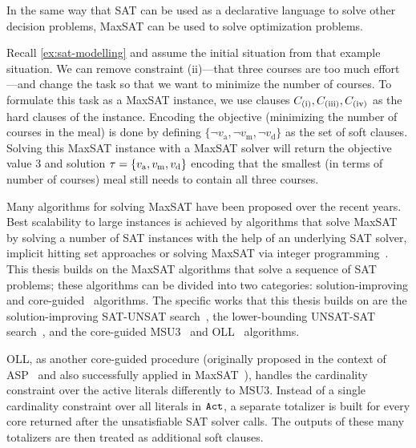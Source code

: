 In the same way that SAT can be used as a declarative language to solve other decision problems, MaxSAT can be used to solve optimization problems.

\begin{example}\label{ex:maxsat-modelling}
  Recall \cref{ex:sat-modelling} and assume the initial situation from that example situation.
  We can remove constraint (ii)---that three courses are too much effort---and change the task so that we want to minimize the number of courses.
  To formulate this task as a MaxSAT instance, we use clauses $C_\text{(i)}, C_\text{(iii)}, C_\text{(iv)}$ as the hard clauses of the instance.
  Encoding the objective (minimizing the number of courses in the meal) is done by defining $\{\lnot v_\text{a}, \lnot v_\text{m}, \lnot v_\text{d}\}$ as the set of soft clauses.
  Solving this MaxSAT instance with a MaxSAT solver will return the objective value 3 and solution $\tau=\{v_\text{a}, v_\text{m}, v_\text{d}\}$ encoding that the smallest (in terms of number of courses) meal still needs to contain all three courses.
\end{example}

Many algorithms for solving MaxSAT have been proposed over the recent years.
Best scalability to large instances is achieved by algorithms that solve MaxSAT by solving a number of SAT instances with the help of an underlying SAT solver, implicit hitting set approaches or solving MaxSAT via integer programming~\autocite{handbook2-maxsat}.
This thesis builds on the MaxSAT algorithms that solve a sequence of SAT problems;
these algorithms can be divided into two categories: solution-improving and core-guided~\autocite{DBLP:conf/sat/FuM06} algorithms.
The specific works that this thesis builds on are the solution-improving SAT-UNSAT search~\autocite{DBLP:journals/jsat/BerreP10}, the lower-bounding UNSAT-SAT search~\autocite{}, and the core-guided MSU3~\autocite{DBLP:journals/corr/abs-0712-1097} and OLL~\autocite{DBLP:conf/cp/MorgadoDM14} algorithms.

OLL, as another core-guided procedure (originally proposed in the context of ASP~\autocite{DBLP:conf/iclp/AndresKMS12} and also successfully applied in MaxSAT~\autocites{DBLP:conf/cp/MorgadoDM14,DBLP:journals/jsat/IgnatievMM19}), handles the cardinality constraint over the active literals differently to MSU3.
Instead of a single cardinality constraint over all literals in $\texttt{Act}$, a separate totalizer is built for every core returned after the unsatisfiable SAT solver calls.
The outputs of these many totalizers are then treated as additional soft clauses.

